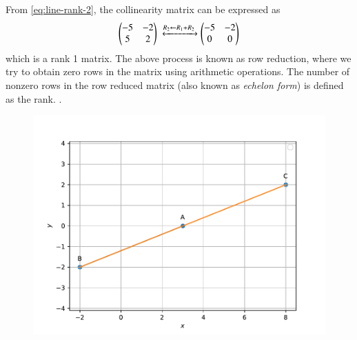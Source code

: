 			From \eqref{eq:line-rank-2},
the collinearity matrix can be expressed as
 \begin{align}
			    \myvec{-5 & -2
			    \\
			    5 & 2 }  
			    \xleftrightarrow[]{R_2 \leftarrow {R_1 + R_2}}
			    \myvec{	    -5 & -2  
			    \\
			    0 & 0}  
\end{align}
which is a rank 1 matrix. The above process is known as row reduction, where we try to obtain zero rows in the matrix using arithmetic operations.  The number of nonzero rows in the row reduced matrix (also known as {\em echelon form})
is defined as the rank.
		.
	\begin{figure}[!ht]
		\centering
 \includegraphics[width=\columnwidth]{chapters/11/10/2/20/figs/figs6.pdf}
		\caption{}
		\label{fig:11/10/2/20}
  	\end{figure}
